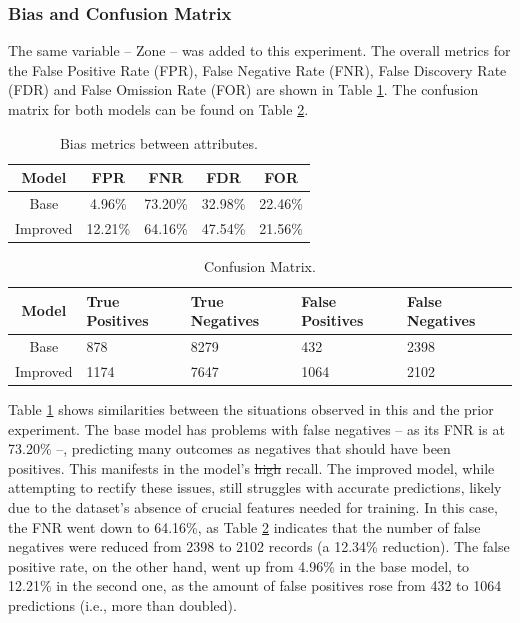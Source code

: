 \documentclass[fleqn,10pt]{wlscirep}
\providecommand{\DIFadd}[1]{{\protect\color{blue}\uwave{#1}}} %
\providecommand{\DIFdel}[1]{{\protect\color{red}\sout{#1}}}                      %
\providecommand{\DIFaddbegin}{} %
\providecommand{\DIFaddend}{} %
\providecommand{\DIFdelbegin}{} %
\providecommand{\DIFdelend}{} %
\begin{document}
\subsubsection{Bias and Confusion Matrix}

The same variable -- Zone -- was added to this experiment. The overall metrics for the False Positive Rate (FPR), False Negative Rate (FNR), False Discovery Rate (FDR) and False Omission Rate (FOR) are shown in Table \ref{tab_bias_hfalta:}. The confusion matrix for both models can be found on Table \ref{tab_cm_hfalta:}.

\begin{table}[!htb]
\centering
\begin{tabular}{|c|c|c|c|c|}\hline
        \textbf{Model} & \textbf{FPR} & \textbf{FNR} & \textbf{FDR} & \textbf{FOR} \\ \hline
        Base & 4.96\% & 73.20\% & 32.98\% & 22.46\%  \\ 
        Improved & 12.21\% & 64.16\% & 47.54\% & 21.56\% \\ 
        \hline
    \end{tabular}
\caption{Bias metrics between attributes.}
\label{tab_bias_hfalta:}
\end{table}

\begin{table}[!htb]
\centering
\begin{tabular}{|c|p{3cm}|p{3cm}|p{3cm}|p{3cm}|}
        \hline
        \textbf{Model} & \textbf{True Positives} & \textbf{True Negatives} & \textbf{False Positives} & \textbf{False Negatives}\\ \hline
        Base & 878 & 8279 & 432 & 2398  \\ 
        Improved & 1174 & 7647 & 1064 & 2102  \\ 
        \hline
    \end{tabular}
\caption{Confusion Matrix.}
\label{tab_cm_hfalta:}
\end{table}

Table \ref{tab_bias_hfalta:} shows similarities between the situations observed in this and the prior experiment. The base model has problems with false negatives -- as its FNR is at 73.20\% --, predicting many outcomes as negatives that should have been positives. This manifests in the model's \DIFdelbegin \DIFdel{high }\DIFdelend \DIFaddbegin \DIFadd{low }\DIFaddend recall. The improved model, while attempting to rectify these issues, still struggles with accurate predictions, likely due to the dataset's absence of crucial features needed for training. In this case, the FNR went down to 64.16\%, as Table \ref{tab_cm_hfalta:} indicates that the number of false negatives were reduced from 2398 to 2102 records (a 12.34\% reduction). The false positive rate, on the other hand, went up from 4.96\% in the base model, to 12.21\% in the second one, as the amount of false positives rose from 432 to 1064 predictions (i.e., more than doubled). 
\end{document}
